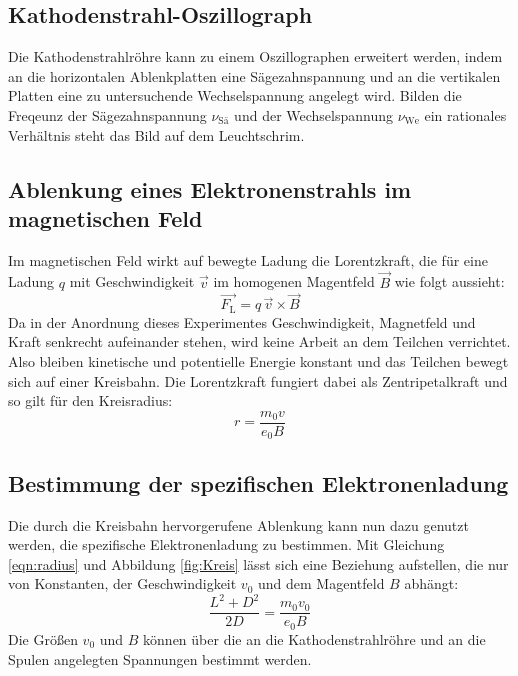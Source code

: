 \subsection{Kathodenstrahl-Oszillograph}
\label{sec:Oszillograph}

Die Kathodenstrahlröhre kann zu einem Oszillographen erweitert werden, indem an die horizontalen Ablenkplatten eine Sägezahnspannung und an die vertikalen Platten eine zu untersuchende Wechselspannung angelegt wird.
Bilden die Freqeunz der Sägezahnspannung $\nu_\text{Sä}$ und der Wechselspannung $\nu_\text{We}$ ein rationales Verhältnis steht das Bild auf dem Leuchtschrim.

\subsection{Ablenkung eines Elektronenstrahls im magnetischen Feld}
\label{sec:magnAblenkung}

Im magnetischen Feld wirkt auf bewegte Ladung die Lorentzkraft, die für eine Ladung $q$ mit Geschwindigkeit $\vec{v}$ im homogenen Magentfeld $\vec{B}$ wie folgt aussieht:
\begin{equation}
  \vec{F_\text{L}} = q \, \vec{v} \times \vec{B}
\end{equation}
Da in der Anordnung dieses Experimentes Geschwindigkeit, Magnetfeld und Kraft senkrecht aufeinander stehen, wird keine Arbeit an dem Teilchen verrichtet.
Also bleiben kinetische und potentielle Energie konstant und das Teilchen bewegt sich auf einer Kreisbahn.
Die Lorentzkraft fungiert dabei als Zentripetalkraft und so gilt für den Kreisradius:
\begin{equation}
  r = \frac{m_0 v}{e_0 B}
  \label{eqn:radius}
\end{equation}

\subsection{Bestimmung der spezifischen Elektronenladung}
\label{sec:Elektronenladung}

Die durch die Kreisbahn hervorgerufene Ablenkung kann nun dazu genutzt werden, die spezifische Elektronenladung zu bestimmen.
Mit Gleichung \eqref{eqn:radius} und Abbildung \ref{fig:Kreis} lässt sich eine Beziehung aufstellen, die nur von Konstanten, der Geschwindigkeit $v_0$ und dem Magentfeld $B$ abhängt:
\begin{equation}
  \frac{L^2 + D^2}{2D} = \frac{m_0 v_0}{e_0 B}
\end{equation}
Die Größen $v_0$ und $B$ können über die an die Kathodenstrahlröhre und an die Spulen angelegten Spannungen bestimmt werden.
